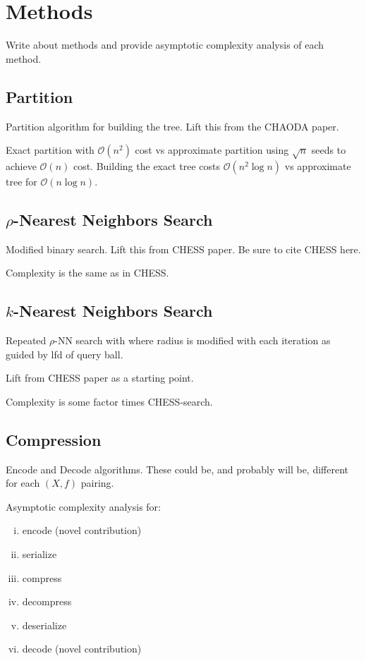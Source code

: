 \section{Methods}
\label{sec:methods}

Write about methods and provide asymptotic complexity analysis of each method.

\subsection{Partition}
\label{subsec:methods:partition}

Partition algorithm for building the tree.
Lift this from the CHAODA paper.

Exact partition with $\mathcal{O}(n^2)$ cost vs approximate partition using $\sqrt{n}$ seeds to achieve $\mathcal{O}(n)$ cost.
Building the exact tree costs $\mathcal{O}(n^2 \log n)$ vs approximate tree for $\mathcal{O}(n \log n)$.

\subsection{\texorpdfstring{$\rho$}{p}-Nearest Neighbors Search}
\label{subsec:methods:rnn-search}

Modified binary search.
Lift this from CHESS paper. Be sure to cite CHESS here.

Complexity is the same as in CHESS.

\subsection{\texorpdfstring{$k$}{k}-Nearest Neighbors Search}
\label{subsec:methods:knn-search}

Repeated $\rho$-NN search with where radius is modified with each iteration as guided by lfd of query ball.

Lift from CHESS paper as a starting point.

Complexity is some factor times CHESS-search.

\subsection{Compression}
\label{subsec:methods:compression}

Encode and Decode algorithms.
These could be, and probably will be, different for each $(X, f)$ pairing.

Asymptotic complexity analysis for:
\begin{enumerate}[i.]
    \item encode (novel contribution)
    \item serialize
    \item compress
    \item decompress
    \item deserialize
    \item decode (novel contribution)
\end{enumerate}

